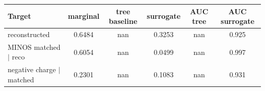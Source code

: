\begin{tabular}{lccccc}
\toprule
Target & marginal & tree baseline & surrogate & AUC tree & AUC surrogate \\
\midrule
reconstructed & 0.6484 & nan & 0.3253 & nan & 0.925 \\
MINOS matched $\mid$ reco & 0.6054 & nan & 0.0499 & nan & 0.997 \\
negative charge $\mid$ matched & 0.2301 & nan & 0.1083 & nan & 0.931 \\
\bottomrule
\end{tabular}
